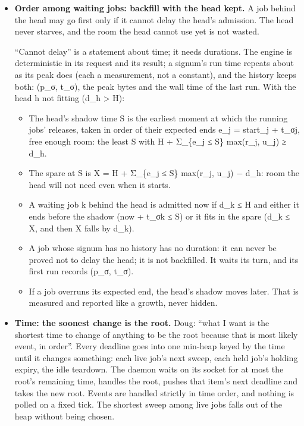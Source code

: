 \begin{itemize}
\item \textbf{Order among waiting jobs: backfill with the head kept.} A job behind the head may go first only if it cannot delay the head's admission. The head never starves, and the room the head cannot use yet is not wasted.

“Cannot delay” is a statement about time; it needs durations. The engine is deterministic in its request and its result; a signum's run time repeats about as its peak does (each a measurement, not a constant), and the history keeps both: (p\_\allowbreak{}σ, t\_\allowbreak{}σ), the peak bytes and the wall time of the last run. With the head h not fitting (d\_\allowbreak{}h > H):

\begin{itemize}
\item The head's shadow time S is the earliest moment at which the running jobs' releases, taken in order of their expected ends e\_\allowbreak{}j = start\_\allowbreak{}j + t\_\allowbreak{}σj, free enough room: the least S with H + Σ\_\allowbreak{}\{e\_\allowbreak{}j ≤ S\} max(r\_\allowbreak{}j, u\_\allowbreak{}j) ≥ d\_\allowbreak{}h.
\item The spare at S is X = H + Σ\_\allowbreak{}\{e\_\allowbreak{}j ≤ S\} max(r\_\allowbreak{}j, u\_\allowbreak{}j) − d\_\allowbreak{}h: room the head will not need even when it starts.
\item A waiting job k behind the head is admitted now if d\_\allowbreak{}k ≤ H and either it ends before the shadow (now + t\_\allowbreak{}σk ≤ S) or it fits in the spare (d\_\allowbreak{}k ≤ X, and then X falls by d\_\allowbreak{}k).
\item A job whose signum has no history has no duration: it can never be proved not to delay the head; it is not backfilled. It waits its turn, and its first run records (p\_\allowbreak{}σ, t\_\allowbreak{}σ).
\item If a job overruns its expected end, the head's shadow moves later. That is measured and reported like a growth, never hidden.
\end{itemize}
\item \textbf{Time: the soonest change is the root.} Doug: “what I want is the shortest time to change of anything to be the root because that is most likely event, in order”. Every deadline goes into one min-heap keyed by the time until it changes something: each live job's next sweep, each held job's holding expiry, the idle teardown. The daemon waits on its socket for at most the root's remaining time, handles the root, pushes that item's next deadline and takes the new root. Events are handled strictly in time order, and nothing is polled on a fixed tick. The shortest sweep among live jobs falls out of the heap without being chosen.

\end{itemize}
